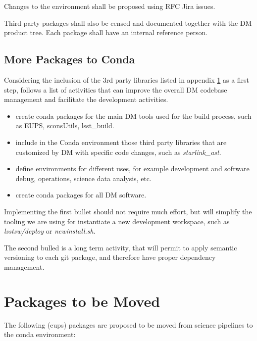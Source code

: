 Changes to the environment shall be proposed using RFC Jira issues.

Third party packages shall also be censed and documented together with the DM product tree. 
Each package shall have an internal reference person.


\subsection{More Packages to Conda}

Considering the inclusion of the 3rd party libraries listed in appendix \ref{sec:tomove} as a first step, follows a list of activities that can improve the overall DM codebase management and facilitate the development activities.

\begin{itemize}
\item create conda packages for the main DM tools used for the build process, such as EUPS, sconsUtils, lsst\_build. 
\item include in the Conda environment those third party libraries that are customized by DM with specific code changes, such as \textit{starlink\_ast}.
\item define environments for different uses, for example development and software debug, operations, science data analysis, etc.
\item create conda packages for all DM software.
\end{itemize}

Implementing the first bullet should not require much effort, but will simplify the tooling we are using for instantiate a new development workspace, such as \textit{lsstsw/deploy} or \textit{newinstall.sh}.

The second bulled is a long term activity, that will permit to apply semantic versioning to each git package, and therefore have proper dependency management.


\newpage
\appendix
\section{Packages to be Moved} \label{sec:tomove}

The following (eups) packages are proposed to be moved from science pipelines to the conda environment:

